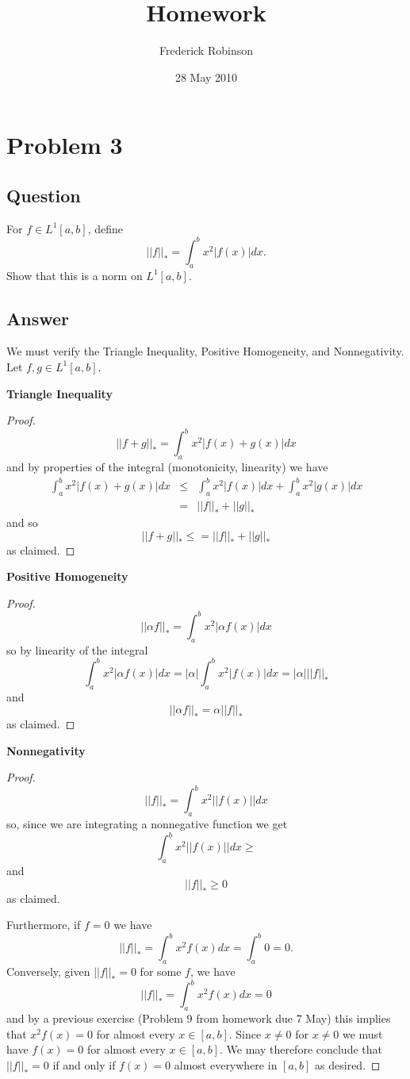 \documentclass[10pt]{article}
\title{Homework}
\author{Frederick Robinson}
\date{28 May 2010}
\begin{document}

   \maketitle

\setcounter{tocdepth}{2} 

\section{Problem 3}
\subsection{Question}
For $f \in L^1[a,b]$, define
\[||f||_* = \int_a^b x^2|f(x)| dx.\]
Show that this is a norm on $L^1[a,b]$.
\subsection{Answer}
We must verify the Triangle Inequality, Positive Homogeneity, and Nonnegativity. Let $f, g \in L^1[a,b]$.

{\bf Triangle Inequality}

\begin{proof}
\[||f+g||_* = \int_a^b x^2 |f(x) + g(x)| dx \]
and by properties of the integral (monotonicity, linearity) we have
\begin{eqnarray*} \int_a^b x^2 |f(x) + g(x)| dx  &\leq& \int_a^b x^2 |f(x)| dx + \int_a^b  x^2 | g(x)|  dx\\
&=&||f||_*+||g||_*
\end{eqnarray*}
and so
\[||f+g||_* \leq = ||f||_*+||g||_*\]
as claimed.
\end{proof}

{\bf Positive Homogeneity }

\begin{proof}
\[||\alpha f||_* = \int_a^b x^2 |\alpha f(x)| dx\]
so by linearity of the integral
\[\int_a^b x^2 |\alpha f(x)| dx  =  |\alpha| \int_a^b x^2 | f(x)| dx = |\alpha| ||f||_*\]
and 
\[||\alpha f||_* = \alpha||f||_*\]
as claimed.
\end{proof}

{\bf Nonnegativity }

\begin{proof}
\[||f||_* = \int_a^b x^2 ||f(x) || dx\]
so, since we are integrating a nonnegative function we get
\[ \int_a^b x^2 ||f(x) || dx \geq\]
and 
\[||f||_*  \geq 0\]
as claimed.

Furthermore, if $f =0$ we have
\[||f||_* = \int_a^b  x^2 f(x) dx = \int_a^b 0 =0 .\]
Conversely, given $||f||_*=0$ for some $f$, we have
\[ ||f||_*=\int_a^b x^2 f(x) dx = 0\]
and by a previous exercise (Problem 9 from homework due 7 May) this implies that $x^2 f(x) =0 $ for almost every $x \in [a,b]$. Since $x \neq 0 $ for $x \neq 0$ we must have $f(x)=0$ for almost every $x \in [a,b]$. We may therefore conclude that $||f||_* = 0$ if and only if $f(x)=0$ almost everywhere in $[a,b]$ as desired.
\end{proof}
\end{document}
